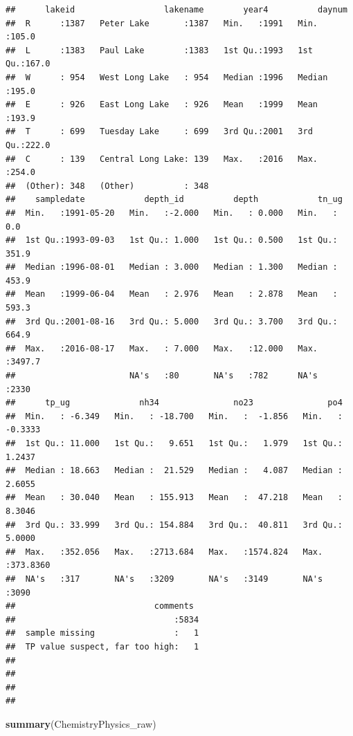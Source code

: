 \documentclass[12pt,]{article}
\newenvironment{Shaded}{\begin{snugshade}}{\end{snugshade}}
\newcommand{\KeywordTok}[1]{\textcolor[rgb]{0.13,0.29,0.53}{\textbf{#1}}}
\newcommand{\NormalTok}[1]{#1}
\begin{document}
\begin{verbatim}
##      lakeid                  lakename        year4          daynum     
##  R      :1387   Peter Lake       :1387   Min.   :1991   Min.   :105.0  
##  L      :1383   Paul Lake        :1383   1st Qu.:1993   1st Qu.:167.0  
##  W      : 954   West Long Lake   : 954   Median :1996   Median :195.0  
##  E      : 926   East Long Lake   : 926   Mean   :1999   Mean   :193.9  
##  T      : 699   Tuesday Lake     : 699   3rd Qu.:2001   3rd Qu.:222.0  
##  C      : 139   Central Long Lake: 139   Max.   :2016   Max.   :254.0  
##  (Other): 348   (Other)          : 348                                 
##    sampledate            depth_id          depth            tn_ug       
##  Min.   :1991-05-20   Min.   :-2.000   Min.   : 0.000   Min.   :   0.0  
##  1st Qu.:1993-09-03   1st Qu.: 1.000   1st Qu.: 0.500   1st Qu.: 351.9  
##  Median :1996-08-01   Median : 3.000   Median : 1.300   Median : 453.9  
##  Mean   :1999-06-04   Mean   : 2.976   Mean   : 2.878   Mean   : 593.3  
##  3rd Qu.:2001-08-16   3rd Qu.: 5.000   3rd Qu.: 3.700   3rd Qu.: 664.9  
##  Max.   :2016-08-17   Max.   : 7.000   Max.   :12.000   Max.   :3497.7  
##                       NA's   :80       NA's   :782      NA's   :2330    
##      tp_ug              nh34               no23               po4          
##  Min.   : -6.349   Min.   : -18.700   Min.   :  -1.856   Min.   : -0.3333  
##  1st Qu.: 11.000   1st Qu.:   9.651   1st Qu.:   1.979   1st Qu.:  1.2437  
##  Median : 18.663   Median :  21.529   Median :   4.087   Median :  2.6055  
##  Mean   : 30.040   Mean   : 155.913   Mean   :  47.218   Mean   :  8.3046  
##  3rd Qu.: 33.999   3rd Qu.: 154.884   3rd Qu.:  40.811   3rd Qu.:  5.0000  
##  Max.   :352.056   Max.   :2713.684   Max.   :1574.824   Max.   :373.8360  
##  NA's   :317       NA's   :3209       NA's   :3149       NA's   :3090      
##                            comments   
##                                :5834  
##  sample missing                :   1  
##  TP value suspect, far too high:   1  
##                                       
##                                       
##                                       
## 
\end{verbatim}

\begin{Shaded}
\begin{Highlighting}[]
\KeywordTok{summary}\NormalTok{(ChemistryPhysics_raw)}
\end{Highlighting}
\end{Shaded}
\end{document}
